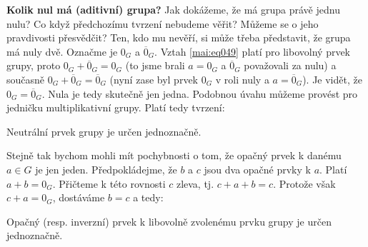 \wikitextrule
\begin{example}\label{mai:exam046}
  \textbf{Kolik nul má (aditivní) grupa?}\newline\small
  Jak dokážeme, že má grupa právě jednu nulu? Co když předchozímu tvrzení nebudeme věřit? Můžeme se 
  o jeho pravdivosti přesvědčit? Ten, kdo mu nevěří, si může třeba představit, že grupa má nuly 
  dvě. Označme je \(0_G\) a \(\overline{0}_G\). Vztah \ref{mai:eq049} platí pro libovolný prvek 
  grupy, proto \(0_G + \overline{0}_G = 0_G\) (to jsme brali \(a = 0_G\) a \(\overline{0}_G\) 
  považovali za nulu) a současně \(0_G + \overline{0}_G = \overline{0}_G\) (nyní zase byl prvek 
  \(0_G\) v roli nuly a \(a = \overline{0}_G\)). Je vidět, že \(0_G = \overline{0}_G\). Nula je 
  tedy skutečně jen jedna. Podobnou úvahu můžeme provést pro jedničku multiplikativní grupy. Platí 
  tedy tvrzení:
  
  Neutrální prvek grupy je určen jednoznačně.
  
  Stejně tak bychom mohli mít pochybnosti o tom, že opačný prvek k danému \(a\in G\) je jen jeden. 
  Předpokládejme, že \(b\) a \(c\) jsou dva opačné prvky k \(a\). Platí \(a + b = 0_G\). Přičteme k 
  této rovnosti \(c\) zleva, tj. \(c + a + b = c\). Protože však \(c + a = 0_G\), dostáváme \(b=c\) 
  a tedy:
  
  Opačný (resp. inverzní) prvek k libovolně zvolenému prvku grupy je určen jednoznačně. 
  \normalsize
\end{example}